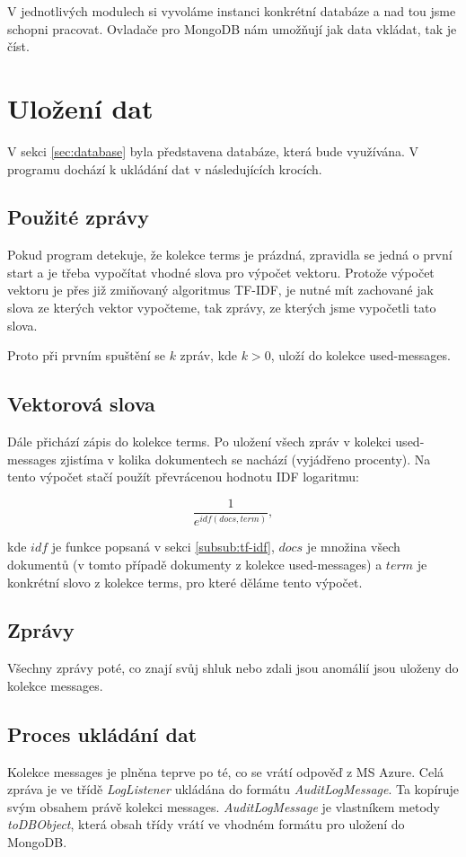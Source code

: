 \documentclass[thesis=M,czech]{FITthesis}[2012/10/20]
\begin{document}
		V jednotlivých modulech si vyvoláme instanci konkrétní databáze a nad tou jsme schopni pracovat. Ovladače pro MongoDB nám umožňují jak data vkládat, tak je číst.

	\section{Uložení dat}
		V sekci \ref{sec:database} byla představena databáze, která bude využívána. V programu dochází k ukládání dat v následujících krocích.
		
		\subsection{Použité zprávy}
			Pokud program detekuje, že kolekce terms je prázdná, zpravidla se jedná o první start a je třeba vypočítat vhodné slova pro výpočet vektoru. Protože výpočet vektoru je přes již zmiňovaný algoritmus TF-IDF, je nutné mít zachované jak slova ze kterých vektor vypočteme, tak zprávy, ze kterých jsme vypočetli tato slova. 
			
			Proto při prvním spuštění se $k$ zpráv, kde $k > 0$, uloží do kolekce used-messages.
			
		\subsection{Vektorová slova}
			Dále přichází zápis do kolekce terms. Po uložení všech zpráv v kolekci used-messages zjistíma v kolika dokumentech se nachází (vyjádřeno procenty). Na tento výpočet stačí použít převrácenou hodnotu IDF  logaritmu:
			
			$$\frac{1}{e^{idf(docs,term)}},$$
			
			kde $idf$ je funkce popsaná v sekci \ref{subsub:tf-idf}, $docs$ je množina všech dokumentů (v tomto případě dokumenty z kolekce used-messages) a $term$ je konkrétní slovo z kolekce terms, pro které děláme tento výpočet.
			
		\subsection{Zprávy}
			Všechny zprávy poté, co znají svůj shluk nebo zdali jsou anomálií jsou uloženy do kolekce messages. 
		
		\subsection{Proces ukládání dat}
			Kolekce messages je plněna teprve po té, co se vrátí odpověď z MS Azure. Celá zpráva je ve třídě \textit{LogListener} ukládána do formátu \textit{AuditLogMessage}. Ta kopíruje svým obsahem právě kolekci messages. \textit{AuditLogMessage} je vlastníkem metody \textit{toDBObject}, která obsah třídy vrátí ve vhodném formátu pro uložení do MongoDB.
			
\end{document}
